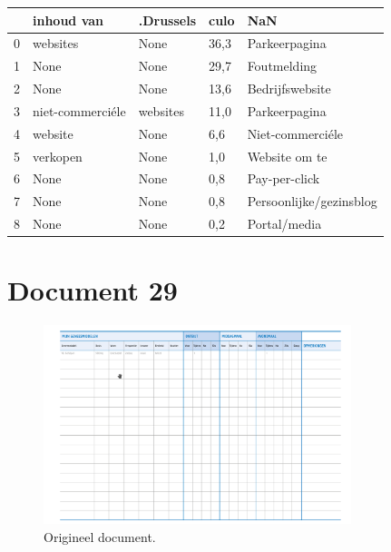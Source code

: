 \begin{tabular}{lllll}
\toprule
{} &        inhoud van & .Drussels &  culo &                      NaN \\
\midrule
0 &          websites &      None &  36,3 &            Parkeerpagina \\
1 &              None &      None &  29,7 &              Foutmelding \\
2 &              None &      None &  13,6 &          Bedrijfswebsite \\
3 &  niet-commerciéle &  websites &  11,0 &            Parkeerpagina \\
4 &           website &      None &   6,6 &         Niet-commerciéle \\
5 &          verkopen &      None &   1,0 &            Website om te \\
6 &              None &      None &   0,8 &            Pay-per-click \\
7 &              None &      None &   0,8 &  Persoonlijke/gezinsblog \\
8 &              None &      None &   0,2 &             Portal/media \\
\bottomrule
\end{tabular}
\section{Document 29}

\begin{figure}[H]
    \centering
    \includegraphics[width=0.8\textwidth]{test-resultaten/29/original.png}
    \caption{Origineel document.}
\end{figure}

